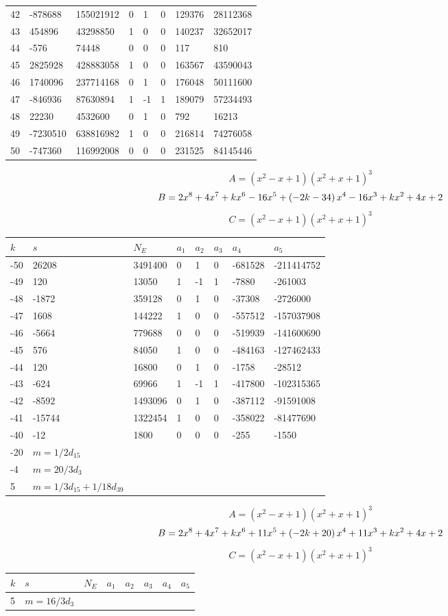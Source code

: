 \documentclass{amsart}
\begin{document}
\begin{longtable}{|l|l|l|lllll|}
42&-878688&155021912&0&1&0&129376&28112368\\
43&454896&43298850&1&0&0&140237&32652017\\
44&-576&74448&0&0&0&117&810\\
45&2825928&428883058&1&0&0&163567&43590043\\
46&1740096&237714168&0&1&0&176048&50111600\\
47&-846936&87630894&1&-1&1&189079&57234493\\
48&22230&4532600&0&1&0&792&16213\\
49&-7230510&638816982&1&0&0&216814&74276058\\
50&-747360&116992008&0&0&0&231525&84145446\\
\hline
\end{longtable}
$$A=(x^2
 - x
 + 1)(x^2
 + x
 + 1)^{3}$$
$$B=2\*x^8
 + 4\*x^7
 + k\*x^6
 - 16\*x^5
 + \left(-2\*k
 - 34\right) \*x^4
 - 16\*x^3
 + k\*x^2
 + 4\*x
 + 2$$
$$C=(x^2
 - x
 + 1)(x^2
 + x
 + 1)^{3}$$
\begin{longtable}{|l|l|l|lllll|}
\hline
$k$ & $s$ & $N_E$ & $a_1$ & $a_2$ & $a_3$ & $a_4$ & $a_5$\\
\hline
-50&26208&3491400&0&1&0&-681528&-211414752\\
-49&120&13050&1&-1&1&-7880&-261003\\
-48&-1872&359128&0&1&0&-37308&-2726000\\
-47&1608&144222&1&0&0&-557512&-157037908\\
-46&-5664&779688&0&0&0&-519939&-141600690\\
-45&576&84050&1&0&0&-484163&-127462433\\
-44&120&16800&0&1&0&-1758&-28512\\
-43&-624&69966&1&-1&1&-417800&-102315365\\
-42&-8592&1493096&0&1&0&-387112&-91591008\\
-41&-15744&1322454&1&0&0&-358022&-81477690\\
-40&-12&1800&0&0&0&-255&-1550\\
-20&$m=1/2d_{15}$&&\multicolumn{5}{c|}{}\\
-4&$m=20/3d_{3}$&&\multicolumn{5}{c|}{}\\
5&$m=1/3d_{15}+1/18d_{39}$&&\multicolumn{5}{c|}{}\\
\hline
\end{longtable}
$$A=(x^2
 - x
 + 1)(x^2
 + x
 + 1)^{3}$$
$$B=2\*x^8
 + 4\*x^7
 + k\*x^6
 + 11\*x^5
 + \left(-2\*k
 + 20\right) \*x^4
 + 11\*x^3
 + k\*x^2
 + 4\*x
 + 2$$
$$C=(x^2
 - x
 + 1)(x^2
 + x
 + 1)^{3}$$
\begin{longtable}{|l|l|l|lllll|}
\hline
$k$ & $s$ & $N_E$ & $a_1$ & $a_2$ & $a_3$ & $a_4$ & $a_5$\\
\hline
5&$m=16/3d_{3}$&&\multicolumn{5}{c|}{}\\
\hline
\end{longtable}
\end{document}

